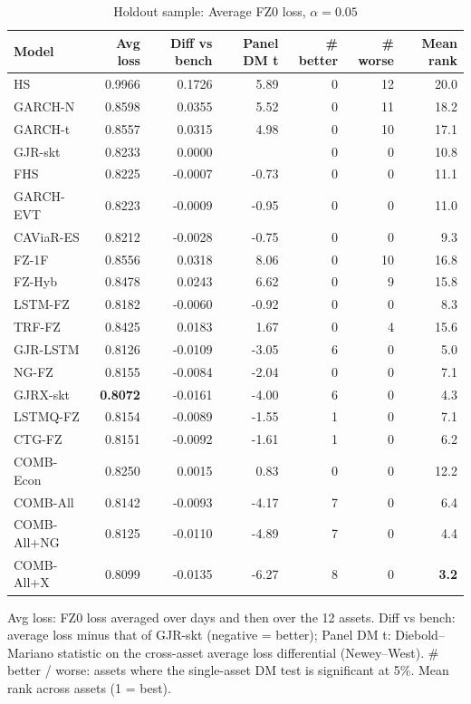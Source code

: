 \begin{table}[htbp]
\centering
\footnotesize
\caption{Holdout sample: Average FZ0 loss, $\alpha=0.05$}
\label{tab:ho_loss_a050}
\begin{tabular}{lrrrrrr}
\toprule
Model & Avg loss & Diff vs bench & Panel DM t & \# better & \# worse & Mean rank \\
\midrule
HS & 0.9966 & 0.1726 & 5.89 & 0 & 12 & 20.0 \\
GARCH-N & 0.8598 & 0.0355 & 5.52 & 0 & 11 & 18.2 \\
GARCH-t & 0.8557 & 0.0315 & 4.98 & 0 & 10 & 17.1 \\
GJR-skt & 0.8233 & 0.0000 &  & 0 & 0 & 10.8 \\
FHS & 0.8225 & -0.0007 & -0.73 & 0 & 0 & 11.1 \\
GARCH-EVT & 0.8223 & -0.0009 & -0.95 & 0 & 0 & 11.0 \\
CAViaR-ES & 0.8212 & -0.0028 & -0.75 & 0 & 0 & 9.3 \\
FZ-1F & 0.8556 & 0.0318 & 8.06 & 0 & 10 & 16.8 \\
FZ-Hyb & 0.8478 & 0.0243 & 6.62 & 0 & 9 & 15.8 \\
LSTM-FZ & 0.8182 & -0.0060 & -0.92 & 0 & 0 & 8.3 \\
TRF-FZ & 0.8425 & 0.0183 & 1.67 & 0 & 4 & 15.6 \\
GJR-LSTM & 0.8126 & -0.0109 & -3.05 & 6 & 0 & 5.0 \\
NG-FZ & 0.8155 & -0.0084 & -2.04 & 0 & 0 & 7.1 \\
GJRX-skt & \textbf{0.8072} & -0.0161 & -4.00 & 6 & 0 & 4.3 \\
LSTMQ-FZ & 0.8154 & -0.0089 & -1.55 & 1 & 0 & 7.1 \\
CTG-FZ & 0.8151 & -0.0092 & -1.61 & 1 & 0 & 6.2 \\
COMB-Econ & 0.8250 & 0.0015 & 0.83 & 0 & 0 & 12.2 \\
COMB-All & 0.8142 & -0.0093 & -4.17 & 7 & 0 & 6.4 \\
COMB-All+NG & 0.8125 & -0.0110 & -4.89 & 7 & 0 & 4.4 \\
COMB-All+X & 0.8099 & -0.0135 & -6.27 & 8 & 0 & \textbf{3.2} \\
\bottomrule
\end{tabular}
\par\smallskip\parbox{\linewidth}{\scriptsize Avg loss: FZ0 loss averaged over days and then over the 12 assets. Diff vs bench: average loss minus that of GJR-skt (negative = better); Panel DM t: Diebold--Mariano statistic on the cross-asset average loss differential (Newey--West). \# better / worse: assets where the single-asset DM test is significant at 5\%. Mean rank across assets (1 = best).}
\end{table}